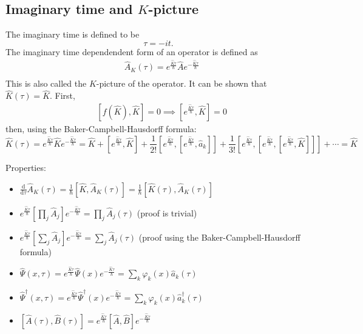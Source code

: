 \documentclass[11pt, a4paper]{article}
\newcommand{\dd}{\mathrm{d}}
\begin{document}
\subsection{Imaginary time and $K$-picture}
The imaginary time is defined to be
\begin{equation*}
    \tau = -it.
\end{equation*}
The imaginary time dependendent form of an operator is defined as 
\begin{align*}
    &\hat A_K(\tau) = e^{\frac{\hat K\tau}{\hbar}}\hat Ae^{-\frac{\hat K\tau}{\hbar}} \\
\end{align*}
This is also called the $K$-picture of the operator. It can be shown that $\hat K(\tau) = \hat K$. First,
\begin{align*}
    & \left[f(\hat K), \hat K \right] = 0 \implies \left[e^{\frac{\hat K\tau}{\hbar}}, \hat K\right] = 0
\end{align*}
then, using the Baker-Campbell-Hausdorff formula:
\begin{equation*}
    \hat K(\tau) = e^{\frac{\hat K\tau}{\hbar}}\hat K e^{-\frac{\hat K\tau}{\hbar}} = \hat K + [e^{\frac{\hat K\tau}{\hbar}}, \hat K] 
    + \frac{1}{2!}[e^{\frac{\hat K\tau}{\hbar}}, [e^{\frac{\hat K\tau}{\hbar}},\hat a_k]]
    + \frac{1}{3!}[e^{\frac{\hat K\tau}{\hbar}}, [e^{\frac{\hat K\tau}{\hbar}}, [e^{\frac{\hat K\tau}{\hbar}},\hat K]]]
    + \cdots = \hat K
\end{equation*}

\par Properties:
\begin{itemize}
    \item $\displaystyle{\frac{\dd}{\dd\tau} \hat A_K(\tau) = \frac{1}{\hbar}[\hat K, \hat A_K(\tau)] = \frac{1}{\hbar}[\hat K(\tau), \hat A_K(\tau)] }$
    \item $\displaystyle{e^{\frac{\hat K\tau}{\hbar}}\left[\prod\limits_j \hat A_j\right]}e^{-\frac{\hat K\tau}{\hbar}} = \prod\limits_j \hat A_j(\tau)$ (proof is trivial)
    \item $\displaystyle{e^{\frac{\hat K\tau}{\hbar}}\left[\sum\limits_j \hat A_j\right]}e^{-\frac{\hat K\tau}{\hbar}} = \sum\limits_j \hat A_j(\tau)$ (proof using the Baker-Campbell-Hausdorff formula)
    \item $\displaystyle{\hat \Psi(x, \tau) = e^{\frac{\hat K\tau}{\hbar}}\hat\Psi(x)e^{-\frac{\hat K\tau}{\hbar}} = \sum\limits_k \varphi_k(x)\hat a_k(\tau)}$
    \item $\displaystyle{\hat \Psi^{\dagger}(x, \tau) = e^{\frac{\hat K\tau}{\hbar}}\hat\Psi^{\dagger}(x)e^{-\frac{\hat K\tau}{\hbar}} = \sum\limits_k \varphi_k(x)\hat a_k^{\dagger}(\tau)}$
    \item $[\hat A(\tau), \hat B(\tau)] = e^{\frac{\hat K\tau}{\hbar}}[\hat A, \hat B]e^{-\frac{\hat K\tau}{\hbar}}$
\end{itemize}
\end{document}

